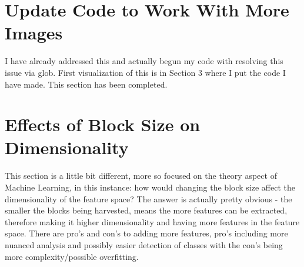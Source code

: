\documentclass[conference]{IEEEtran} %
\begin{document}
\section{Update Code to Work With More Images}
I have already addressed this and actually begun my code with resolving this issue via glob. First visualization of this is in Section 3 where I put the code I have made.  This section has been completed.

\section{Effects of Block Size on Dimensionality}
This section is a little bit different, more so focused on the theory aspect of Machine Learning, in this instance: how would changing the block size affect the dimensionality of the feature space?  The answer is actually pretty obvious - the smaller the blocks being harvested, means the more features can be extracted, therefore making it higher dimensionality and having more features in the feature space.  There are pro's and con's to adding more features, pro's including more nuanced analysis and possibly easier detection of classes with the con's being more complexity/possible overfitting. 
\end{document}
